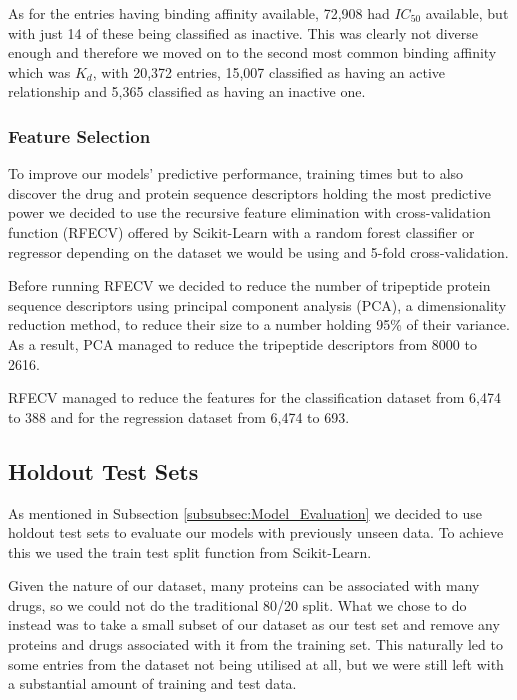 As for the entries having binding affinity available, 72,908 had $IC_{50}$ available, but with just 14 of these being classified as inactive. This was clearly not diverse enough and therefore we moved on to the second most common binding affinity which was $K_d$, with 20,372 entries, 15,007 classified as having an active relationship and 5,365 classified as having an inactive one.

\subsubsection{Feature Selection}
\label{subsubsec:Feature_Selection}

To improve our models' predictive performance, training times but to also discover the drug and protein sequence descriptors holding the most predictive power we decided to use the recursive feature elimination with cross-validation function (RFECV) offered by Scikit-Learn with a random forest classifier or regressor depending on the dataset we would be using and 5-fold cross-validation.

Before running RFECV we decided to reduce the number of tripeptide protein sequence descriptors using principal component analysis (PCA), a dimensionality reduction method, to reduce their size to a number holding 95\% of their variance. As a result, PCA managed to reduce the tripeptide descriptors from 8000 to 2616.

RFECV managed to reduce the features for the classification dataset from 6,474 to 388 and for the regression dataset from 6,474 to 693. 

\subsection{Holdout Test Sets}

As mentioned in Subsection \ref{subsubsec:Model_Evaluation} we decided to use holdout test sets to evaluate our models with previously unseen data. To achieve this we used the train test split function from Scikit-Learn.

Given the nature of our dataset, many proteins can be associated with many drugs, so we could not do the traditional 80/20 split. What we chose to do instead was to take a small subset of our dataset as our test set and remove any proteins and drugs associated with it from the training set. This naturally led to some entries from the dataset not being utilised at all, but we were still left with a substantial amount of training and test data.

